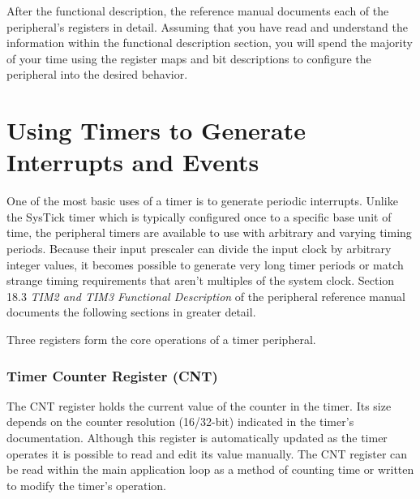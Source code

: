 \documentclass[11pt,fleqn]{book} %
\begin{document}
    After the functional description, the reference manual documents each of the peripheral's registers in detail. Assuming that you have read and understand the information within the functional description section, you will spend the majority of your time using the register maps and bit descriptions to configure the peripheral into the desired behavior. 

%    
%    

\section{Using Timers to Generate Interrupts and Events} \label{timer_interrupts}

    One of the most basic uses of a timer is to generate periodic interrupts. Unlike the SysTick timer which is typically configured once to a specific base unit of time, the peripheral timers are available to use with arbitrary and varying timing periods. Because their input prescaler can divide the input clock by arbitrary integer values, it becomes possible to generate very long timer periods or match strange timing requirements that aren't multiples of the system clock. Section 18.3 \textit{TIM2 and TIM3 Functional Description} of the peripheral reference manual documents the following sections in greater detail. 
    
    Three registers form the core operations of a timer peripheral. 
    \subsubsection{Timer Counter Register (CNT)}
    The CNT register holds the current value of the counter in the timer. Its size depends on the counter resolution (16/32-bit) indicated in the timer's documentation. Although this register is automatically updated as the timer operates it is possible to read and edit its value manually. The CNT register can be read within the main application loop as a method of counting time or written to modify the timer's operation. 
\end{document}
